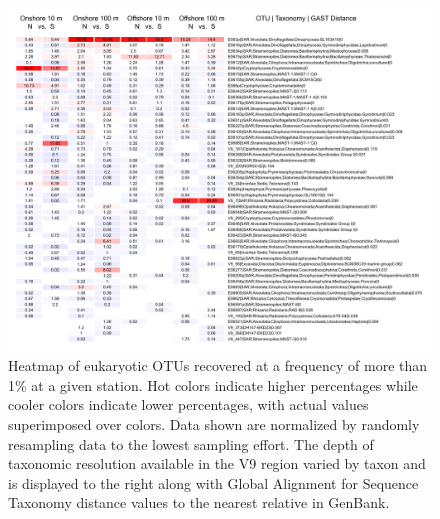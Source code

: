 \begin{figure}[htbp] 
\centering 
\includegraphics[width=\textwidth]{Chapter_2_MIRADA/Figures/Supplemental_2_euk_random_Rplot_4ms} 
\caption[Heatmap of eukaryotic OTUs.]{Heatmap of eukaryotic OTUs recovered at a frequency of more than 1\% at a given station. Hot colors indicate higher percentages while cooler colors indicate lower percentages, with actual values superimposed over colors. Data shown are normalized by randomly resampling data to the lowest sampling effort. The depth of taxonomic resolution available in the V9 region varied by taxon and is displayed to the right along with Global Alignment for Sequence Taxonomy \citep{hdhwrs08} distance values to the nearest relative in GenBank.} 
\label{fig:ch1:supp2} 
\end{figure}

